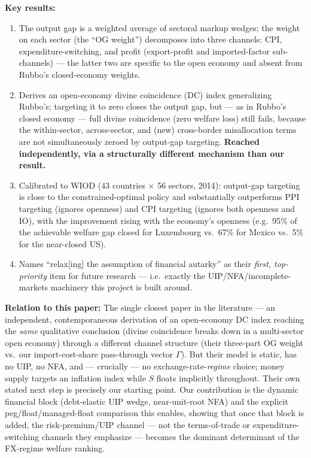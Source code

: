 \documentclass[12pt]{article}
\begin{document}
\textbf{Key results:}
\begin{enumerate}
    \item The output gap is a weighted average of sectoral markup wedges; the weight on each sector (the ``OG weight'') decomposes into three channels: CPI, expenditure-switching, and profit (export-profit and imported-factor sub-channels) --- the latter two are specific to the open economy and absent from Rubbo's closed-economy weights.
    \item Derives an open-economy divine coincidence (DC) index generalizing Rubbo's; targeting it to zero closes the output gap, but --- as in Rubbo's closed economy --- full divine coincidence (zero welfare loss) still fails, because the within-sector, across-sector, and (new) cross-border misallocation terms are not simultaneously zeroed by output-gap targeting. \textbf{Reached independently, via a structurally different mechanism than our result.}
    \item Calibrated to WIOD (43 countries $\times$ 56 sectors, 2014): output-gap targeting is close to the constrained-optimal policy and substantially outperforms PPI targeting (ignores openness) and CPI targeting (ignores both openness and IO), with the improvement rising with the economy's openness (e.g.\ 95\% of the achievable welfare gap closed for Luxembourg vs.\ 67\% for Mexico vs.\ 5\% for the near-closed US).
    \item Names ``relax[ing] the assumption of financial autarky'' as their \emph{first, top-priority} item for future research --- i.e.\ exactly the UIP/NFA/incomplete-markets machinery this project is built around.
\end{enumerate}

\textbf{Relation to this paper:} The single closest paper in the literature --- an independent, contemporaneous derivation of an open-economy DC index reaching the \emph{same} qualitative conclusion (divine coincidence breaks down in a multi-sector open economy) through a different channel structure (their three-part OG weight vs.\ our import-cost-share pass-through vector $\Gamma$). But their model is static, has no UIP, no NFA, and --- crucially --- no exchange-rate-\emph{regime} choice; money supply targets an inflation index while $S$ floats implicitly throughout. Their own stated next step is precisely our starting point. Our contribution is the dynamic financial block (debt-elastic UIP wedge, near-unit-root NFA) and the explicit peg/float/managed-float comparison this enables, showing that once that block is added, the risk-premium/UIP channel --- not the terms-of-trade or expenditure-switching channels they emphasize --- becomes the dominant determinant of the FX-regime welfare ranking.
\end{document}
